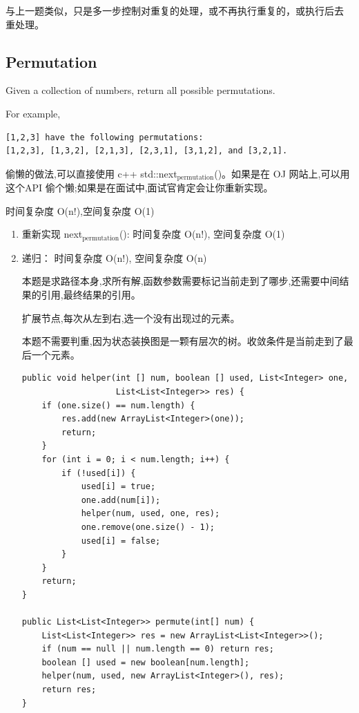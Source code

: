\documentclass[12pt]{book}
\begin{document}
\begin{enumerate}
与上一题类似，只是多一步控制对重复的处理，或不再执行重复的，或执行后去
重处理。
\end{enumerate}

\subsection{Permutation}
\label{sec-9-1-3}
Given a collection of numbers, return all possible permutations.

For example,
\lstset{language=java,label= ,caption= ,numbers=none}
\begin{lstlisting}
[1,2,3] have the following permutations:
[1,2,3], [1,3,2], [2,1,3], [2,3,1], [3,1,2], and [3,2,1].
\end{lstlisting}

偷懒的做法,可以直接使用 c++ std::next$_{\text{permutation}}$()。如果是在 OJ 网站上,可以用这个API 偷个懒;如果是在面试中,面试官肯定会让你重新实现。

时间复杂度 O(n!),空间复杂度 O(1)

\begin{enumerate}
\item 重新实现 next$_{\text{permutation}}$(): 时间复杂度 O(n!), 空间复杂度 O(1)
\label{sec-9-1-3-1}
\item 递归： 时间复杂度 O(n!), 空间复杂度 O(n)
\label{sec-9-1-3-2}

本题是求路径本身,求所有解,函数参数需要标记当前走到了哪步,还需要中间结果的引用,最终结果的引用。

扩展节点,每次从左到右,选一个没有出现过的元素。

本题不需要判重,因为状态装换图是一颗有层次的树。收敛条件是当前走到了最
后一个元素。

\lstset{language=java,label= ,caption= ,numbers=none}
\begin{lstlisting}
public void helper(int [] num, boolean [] used, List<Integer> one,
                   List<List<Integer>> res) {
    if (one.size() == num.length) {
        res.add(new ArrayList<Integer>(one));
        return;
    }
    for (int i = 0; i < num.length; i++) {
        if (!used[i]) {
            used[i] = true;
            one.add(num[i]);
            helper(num, used, one, res);
            one.remove(one.size() - 1);
            used[i] = false;
        }
    }
    return;
}

public List<List<Integer>> permute(int[] num) {
    List<List<Integer>> res = new ArrayList<List<Integer>>();
    if (num == null || num.length == 0) return res;
    boolean [] used = new boolean[num.length];
    helper(num, used, new ArrayList<Integer>(), res);
    return res;
}
\end{lstlisting}
\end{enumerate}
\end{document}
